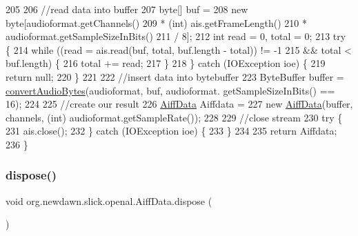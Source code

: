 \begin{DoxyCode}
205 
206         \textcolor{comment}{//read data into buffer}
207         byte[] buf =
208             \textcolor{keyword}{new} byte[audioformat.getChannels()
209                 * (int) ais.getFrameLength()
210                 * audioformat.getSampleSizeInBits()
211                 / 8];
212         \textcolor{keywordtype}{int} read = 0, total = 0;
213         \textcolor{keywordflow}{try} \{
214             \textcolor{keywordflow}{while} ((read = ais.read(buf, total, buf.length - total)) != -1
215                 && total < buf.length) \{
216                 total += read;
217             \}
218         \} \textcolor{keywordflow}{catch} (IOException ioe) \{
219             \textcolor{keywordflow}{return} null;
220         \}
221 
222         \textcolor{comment}{//insert data into bytebuffer}
223         ByteBuffer buffer = \mbox{\hyperlink{classorg_1_1newdawn_1_1slick_1_1openal_1_1_aiff_data_a00be2b6b6b5817dfe4fb37eab2aac619}{convertAudioBytes}}(audioformat, buf, audioformat.
      getSampleSizeInBits() == 16);
224 
225         \textcolor{comment}{//create our result}
226         \mbox{\hyperlink{classorg_1_1newdawn_1_1slick_1_1openal_1_1_aiff_data_a55631a1053adb8e9a8a8ce4751b30685}{AiffData}} Aiffdata =
227             \textcolor{keyword}{new} \mbox{\hyperlink{classorg_1_1newdawn_1_1slick_1_1openal_1_1_aiff_data_a55631a1053adb8e9a8a8ce4751b30685}{AiffData}}(buffer, channels, (\textcolor{keywordtype}{int}) audioformat.getSampleRate());
228 
229         \textcolor{comment}{//close stream}
230         \textcolor{keywordflow}{try} \{
231             ais.close();
232         \} \textcolor{keywordflow}{catch} (IOException ioe) \{
233         \}
234 
235         \textcolor{keywordflow}{return} Aiffdata;
236     \}
\end{DoxyCode}
\mbox{\label{classorg_1_1newdawn_1_1slick_1_1openal_1_1_aiff_data_af575f6fa8e4c93a2a3c2820974e48371}} 
\subsubsection{\texorpdfstring{dispose()}{dispose()}}
{\footnotesize\ttfamily void org.\+newdawn.\+slick.\+openal.\+Aiff\+Data.\+dispose (\begin{DoxyParamCaption}{ }\end{DoxyParamCaption})\hspace{0.3cm}{\ttfamily [inline]}}

